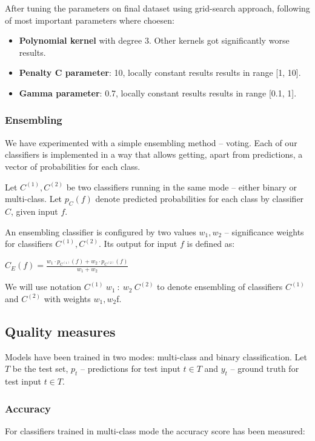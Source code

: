         After tuning the parameters on final dataset using grid-search approach, following of most important parameters where choesen:
        \begin{itemize}
            \item \textbf{Polynomial kernel} with degree 3. Other kernels got significantly worse results.
            \item \textbf{Penalty C parameter}: 10, locally constant results results in range [1, 10].
            \item \textbf{Gamma parameter}: 0.7, locally constant results results in range [0.1, 1].
        \end{itemize}

        \subsubsection{Ensembling}
        We have experimented with a simple ensembling method -- voting.
        Each of our classifiers is implemented in a way that allows getting,
        apart from predictions, a vector of probabilities for each class.

        Let $C^{(1)}, C^{(2)}$ be two classifiers running in the same mode -- either
        binary or multi-class.
        Let $p_{C}(f)$ denote predicted probabilities for each class by classifier $C$,
        given input $f$.

        An ensembling classifier is configured by two values $w_1, w_2$ -- significance
        weights for classifiers $C^{(1)}, C^{(2)}$. Its output for input $f$ is defined as:
        \begin{center}
        $C_{E}(f) = \frac{w_{1} \cdot p_{C^{(1)}}(f) + w_{2} \cdot p_{C^{(2)}}(f)}{w_{1} + w_{2}}$
        \end{center}

        We will use notation $C^{(1)}\ w_{1}\ :\ w_{2}\ C^{(2)}$ to denote ensembling
        of classifiers $C^{(1)}$ and $C^{(2)}$ with weights $w_{1}, w_{2}$f.


    \subsection{Quality measures}
        Models have been trained in two modes: multi-class and binary
        classification. Let $T$ be the test set, $p_t$ -- predictions for test input
        $t \in T$ and $y_t$ -- ground truth for test input $t \in T$.
        \subsubsection*{Accuracy}
        For classifiers trained in multi-class mode the accuracy score has been
        measured:

